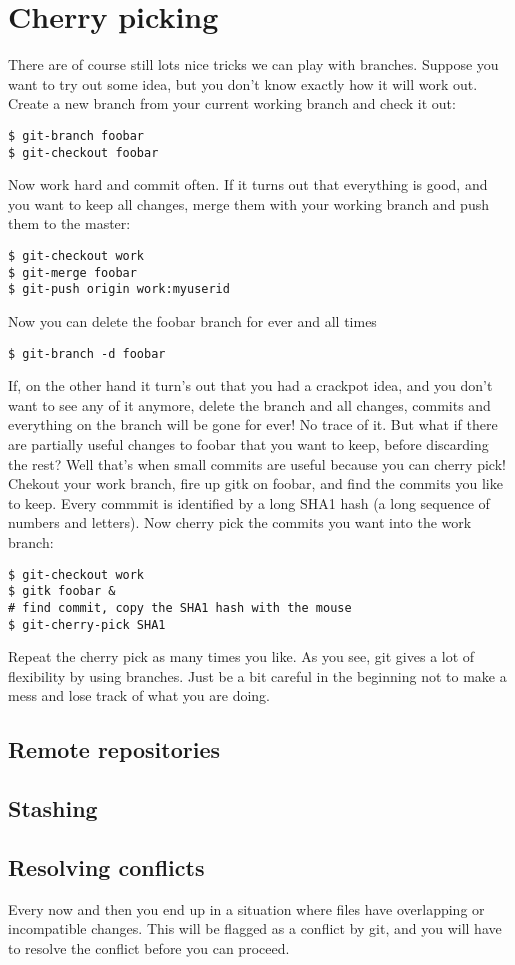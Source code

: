 \documentclass[a4paper,10pt]{article}
\begin{document}
\section{Cherry picking}
There are of course still lots nice tricks we can play with
branches. Suppose you want to try out some idea, but you don't know exactly
how it will work out. Create a new branch from your current working branch and
check it out:
\begin{verbatim}
$ git-branch foobar
$ git-checkout foobar
\end{verbatim}
Now work hard and commit often. If it turns out that everything is good, and
you want to keep all changes, merge them with your working branch and push
them to the master:
\begin{verbatim}
$ git-checkout work
$ git-merge foobar
$ git-push origin work:myuserid
\end{verbatim}
Now you can delete the foobar branch for ever and all times
\begin{verbatim}
$ git-branch -d foobar
\end{verbatim}
If, on the other hand it turn's out that you had a crackpot idea, and you
don't want to see any of it anymore, delete the branch and all changes,
commits and everything on the branch will be gone for ever! No trace of it.
But what if there are partially useful changes to foobar that you want to
keep, before discarding the rest? Well that's when small commits are useful
because you can cherry pick! Chekout your work branch, fire up gitk on foobar,
and find the commits you like to keep. Every commmit is identified by a long
SHA1 hash (a long sequence of numbers and letters). Now cherry pick the
commits you want into the work branch:
\begin{verbatim}
$ git-checkout work
$ gitk foobar &
# find commit, copy the SHA1 hash with the mouse
$ git-cherry-pick SHA1
\end{verbatim}
Repeat the cherry pick as many times you like. As you see, git gives a lot of
flexibility by using branches. Just be a bit careful in the beginning not to
make a mess and lose track of what you are doing. 

\subsection{Remote repositories}
\subsection{Stashing}
\subsection{Resolving conflicts}
Every now and then you end up in a situation where files have overlapping or
incompatible changes. This will be flagged as a conflict by git, and you will
have to resolve the conflict before you can proceed.
\end{document}
